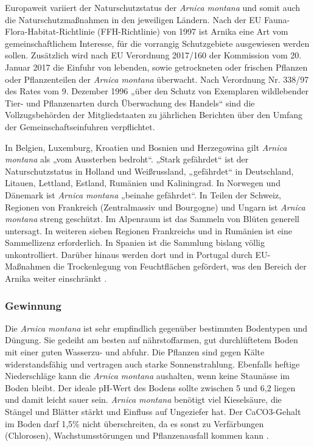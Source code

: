 
Europaweit variiert der Naturschutzstatus der \textit{Arnica montana} und somit auch die Naturschutzmaßnahmen in den jeweiligen Ländern. Nach der EU Fauna-Flora-Habitat-Richtlinie (FFH-Richtlinie) von 1997 ist Arnika eine Art vom gemeinschaftlichem Interesse, für die vorrangig Schutzgebiete ausgewiesen werden sollen. Zusätzlich wird nach EU Verordnung 2017/160 der Kommission vom 20. Januar 2017 die Einfuhr von lebenden, sowie getrockneten oder frischen Pflanzen oder Pflanzenteilen der \textit{Arnica montana} überwacht. Nach Verordnung Nr. 338/97 des Rates vom 9. Dezember 1996 „über den Schutz von Exemplaren wildlebender Tier- und Pflanzenarten durch Überwachung des Handels“ sind die Vollzugsbehörden der Mitgliedstaaten zu jährlichen Berichten über den Umfang der Gemeinschaftseinfuhren verpflichtet. %

In Belgien, Luxemburg, Kroatien und Bosnien und Herzegowina gilt \textit{Arnica montana} als „vom Aussterben bedroht“. „Stark gefährdet“ ist der Naturschutzstatus in Holland und Weißrussland, „gefährdet“ in Deutschland, Litauen, Lettland, Estland, Rumänien und Kaliningrad. In Norwegen und Dänemark ist \textit{Arnica montana} „beinahe gefährdet“.
In Teilen der Schweiz, Regionen von Frankreich (Zentralmassiv und Bourgogne) und Ungarn ist \textit{Arnica montana} streng geschützt. Im Alpenraum ist das Sammeln von Blüten generell untersagt. In weiteren sieben Regionen Frankreichs und in Rumänien ist eine Sammellizenz erforderlich. In Spanien ist die Sammlung bislang völlig unkontrolliert. Darüber hinaus werden dort und in Portugal durch EU-Maßnahmen die Trockenlegung von Feuchtflächen gefördert, was den Bereich der Arnika weiter einschränkt \citep[vgl.][]{Franke2012}.

\subsubsection{Gewinnung}  

Die \textit{Arnica montana} ist sehr empfindlich gegenüber bestimmten Bodentypen und Düngung. Sie gedeiht am besten auf nährstoffarmen, gut durchlüftetem Boden mit einer guten Wasserzu- und abfuhr. Die Pflanzen sind gegen Kälte widerstandsfähig und vertragen auch starke Sonnenstrahlung. Ebenfalls heftige Niederschläge kann die \textit{Arnica montana} aushalten, wenn keine Staunässe im Boden bleibt. Der ideale pH-Wert des Bodens sollte zwischen 5 und 6,2 liegen und damit leicht sauer sein. \textit{Arnica montana} benötigt viel Kieselsäure, die Stängel und Blätter stärkt und Einfluss auf Ungeziefer hat. Der CaCO3-Gehalt im Boden darf 1,5\% nicht überschreiten, da es sonst zu Verfärbungen (Chlorosen), Wachstumsstörungen und Pflanzenausfall kommen kann \citep[vgl.][]{Franke2012, FNR2013, Heeger1956}.


